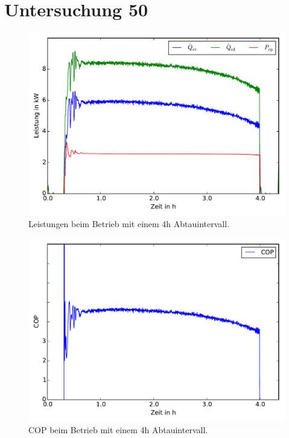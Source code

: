 \section{Untersuchung 50}

\begin{figure}[h!]
\centering
\includegraphics[scale=0.8]{Pictures/50/Qdots_lastCycle.pdf}
\caption{Leistungen beim Betrieb mit einem 4h Abtauintervall.}
\label{fig:Leistungen50}
\end{figure}

\begin{figure}[h!]
\centering
\includegraphics[scale=0.8]{Pictures/50/COP_lastCycle.pdf}
\caption{COP beim Betrieb mit einem 4h Abtauintervall.}
\label{fig:COP50}
\end{figure}

